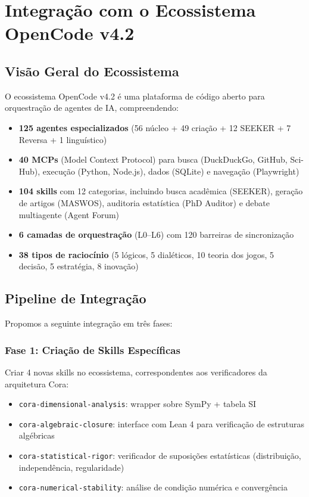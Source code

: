 \documentclass[5p]{elsarticle}
\theoremstyle{remark}
\begin{document}
\section{Integração com o Ecossistema OpenCode v4.2}

\subsection{Visão Geral do Ecossistema}

O ecossistema OpenCode v4.2 \cite{OpenCode2025Ecosystem} é uma plataforma de código aberto para orquestração de agentes de IA, compreendendo:

\begin{itemize}
    \item \textbf{125 agentes especializados} (56 núcleo + 49 criação + 12 SEEKER + 7 Reversa + 1 linguístico)
    \item \textbf{40 MCPs} (Model Context Protocol) para busca (DuckDuckGo, GitHub, Sci-Hub), execução (Python, Node.js), dados (SQLite) e navegação (Playwright)
    \item \textbf{104 skills} com 12 categorias, incluindo busca acadêmica (SEEKER), geração de artigos (MASWOS), auditoria estatística (PhD Auditor) e debate multiagente (Agent Forum)
    \item \textbf{6 camadas de orquestração} (L0--L6) com 120 barreiras de sincronização
    \item \textbf{38 tipos de raciocínio} (5 lógicos, 5 dialéticos, 10 teoria dos jogos, 5 decisão, 5 estratégia, 8 inovação)
\end{itemize}

\subsection{Pipeline de Integração}

Propomos a seguinte integração em três fases:

\subsubsection{Fase 1: Criação de Skills Específicas}

Criar 4 novas skills no ecossistema, correspondentes aos verificadores da arquitetura Cora:

\begin{itemize}
    \item \texttt{cora-dimensional-analysis}: wrapper sobre SymPy + tabela SI
    \item \texttt{cora-algebraic-closure}: interface com Lean 4 para verificação de estruturas algébricas
    \item \texttt{cora-statistical-rigor}: verificador de suposições estatísticas (distribuição, independência, regularidade)
    \item \texttt{cora-numerical-stability}: análise de condição numérica e convergência
\end{itemize}
\end{document}

